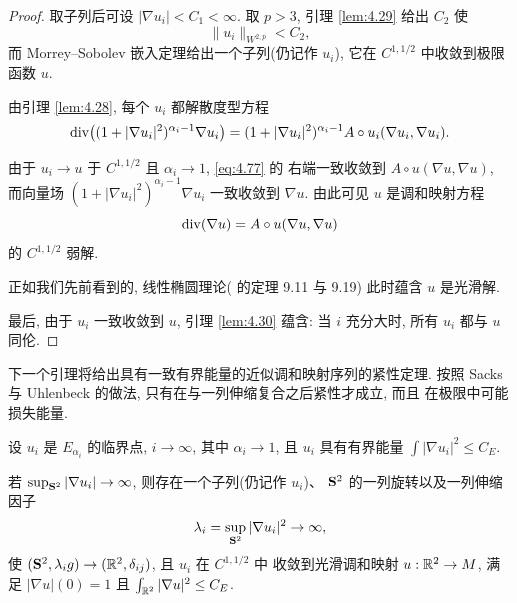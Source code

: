 \begin{proof}
取子列后可设 $|\nabla u_i|<C_1<\infty$. 取 $p>3$, 引理 \ref{lem:4.29}
给出 $C_2$ 使
\begin{equation*}
\|u_i\|_{W^{2,p}}<C_2,
\end{equation*}
而 Morrey--Sobolev 嵌入定理给出一个子列(仍记作 $u_i$), 它在
$C^{1,1/2}$ 中收敛到极限函数 $u$.

由引理 \ref{lem:4.28}, 每个 $u_i$ 都解散度型方程
\begin{equation}
\operatorname{div}\bigl((1+|\nabla u_i|^2)^{\alpha_i-1}\nabla u_i\bigr)
 =(1+|\nabla u_i|^2)^{\alpha_i-1}A\circ u_i(\nabla u_i,\nabla u_i).
\label{eq:4.77}
\end{equation}

由于 $u_i\to u$ 于 $C^{1,1/2}$ 且 $\alpha_i\to1$, \eqref{eq:4.77} 的
右端一致收敛到 $A\circ u(\nabla u,\nabla u)$, 而向量场
$(1+|\nabla u_i|^2)^{\alpha_i-1}\nabla u_i$ 一致收敛到 $\nabla u$.
由此可见 $u$ 是调和映射方程
\begin{equation*}
\operatorname{div}(\nabla u)=A\circ u(\nabla u,\nabla u)
\end{equation*}
的 $C^{1,1/2}$ 弱解.

正如我们先前看到的, 线性椭圆理论(\cite{GiTr} 的定理 9.11 与 9.19)
此时蕴含 $u$ 是光滑解.

最后, 由于 $u_i$ 一致收敛到 $u$, 引理 \ref{lem:4.30} 蕴含: 当 $i$
充分大时, 所有 $u_i$ 都与 $u$ 同伦.
\end{proof}

下一个引理将给出具有一致有界能量的近似调和映射序列的紧性定理. 按照
Sacks 与 Uhlenbeck 的做法, 只有在与一列伸缩复合之后紧性才成立, 而且
在极限中可能损失能量.

\begin{lemma}
\label{lem:4.33}
设 $u_i$ 是 $E_{\alpha_i}$ 的临界点, $i\to\infty$, 其中 $\alpha_i\to1$,
且 $u_i$ 具有有界能量 $\int|\nabla u_i|^2\leq C_E$.

若 $\sup_{\mathbf{S}^2}|\nabla u_i|\to\infty$, 则存在一个子列(仍记作 $u_i$)、
$\mathbf{S}^2$ 的一列旋转以及一列伸缩因子
\begin{equation}
\lambda_i=\sup_{\mathbf{S}^2}|\nabla u_i|^2\to\infty,
\label{eq:4.78}
\end{equation}
使 $(\mathbf{S}^2,\lambda_ig)\to(\mathbb{R}^2,\delta_{ij})$, 且 $u_i$ 在 $C^{1,1/2}$ 中
收敛到光滑调和映射 $u:\mathbb{R}^2\to M$, 满足 $|\nabla u|(0)=1$ 且
$\int_{\mathbb{R}^2}|\nabla u|^2\leq C_E$.
\end{lemma}

